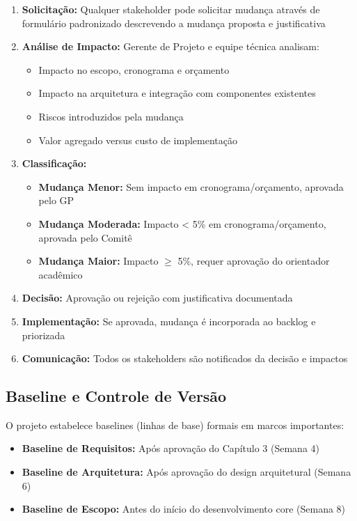 \begin{enumerate}
    \item \textbf{Solicitação:} Qualquer stakeholder pode solicitar mudança através de formulário padronizado descrevendo a mudança proposta e justificativa

    \item \textbf{Análise de Impacto:} Gerente de Projeto e equipe técnica analisam:
    \begin{itemize}
        \item Impacto no escopo, cronograma e orçamento
        \item Impacto na arquitetura e integração com componentes existentes
        \item Riscos introduzidos pela mudança
        \item Valor agregado versus custo de implementação
    \end{itemize}

    \item \textbf{Classificação:}
    \begin{itemize}
        \item \textbf{Mudança Menor:} Sem impacto em cronograma/orçamento, aprovada pelo GP
        \item \textbf{Mudança Moderada:} Impacto < 5\% em cronograma/orçamento, aprovada pelo Comitê
        \item \textbf{Mudança Maior:} Impacto \(\geq\) 5\%, requer aprovação do orientador acadêmico
    \end{itemize}

    \item \textbf{Decisão:} Aprovação ou rejeição com justificativa documentada

    \item \textbf{Implementação:} Se aprovada, mudança é incorporada ao backlog e priorizada

    \item \textbf{Comunicação:} Todos os stakeholders são notificados da decisão e impactos
\end{enumerate}

\subsection{Baseline e Controle de Versão}

O projeto estabelece baselines (linhas de base) formais em marcos importantes:
\begin{itemize}
    \item \textbf{Baseline de Requisitos:} Após aprovação do Capítulo 3 (Semana 4)
    \item \textbf{Baseline de Arquitetura:} Após aprovação do design arquitetural (Semana 6)
    \item \textbf{Baseline de Escopo:} Antes do início do desenvolvimento core (Semana 8)
\end{itemize}

